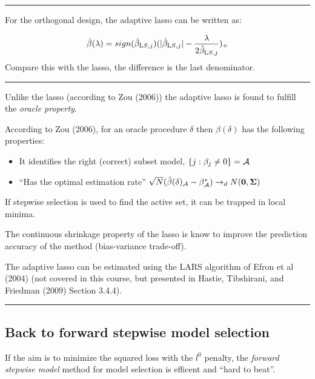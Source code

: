 \documentclass[
  letterpaper,
  DIV=11,
  numbers=noendperiod]{scrartcl}
\providecommand{\tightlist}{%
  \setlength{\itemsep}{0pt}\setlength{\parskip}{0pt}}\usepackage{longtable,booktabs,array}
\begin{document}
\begin{center}\rule{0.5\linewidth}{0.5pt}\end{center}

For the orthogonal design, the adaptive lasso can be written as:

\[\hat{\beta}(\lambda)=sign(\hat{\beta}_{{\text LS},j})(\lvert \hat{\beta}_{{\text LS},j}\rvert -\frac{\lambda}{2 \hat{\beta}_{{\text LS},j}} )_{+}\]
Compare this with the lasso, the difference is the last denominator.

\begin{center}\rule{0.5\linewidth}{0.5pt}\end{center}

Unlike the lasso (according to Zou (2006)) the adaptive lasso is found
to fulfill the \emph{oracle property}.

According to Zou (2006), for an oracle procedure \(\delta\) then
\(\beta(\delta)\) has the following properties:

\begin{itemize}
\tightlist
\item
  It identifies the right (correct) subset model,
  \(\{j: \beta_j \neq0\}={\cal A}\)
\item
  ``Has the optimal estimation rate''
  \(\sqrt{N}(\hat{\beta}(\delta)_{\cal A}-\beta^*_{\cal A})\rightarrow_d N(\boldsymbol 0,\boldsymbol \Sigma)\)
\end{itemize}

If stepwise selection is used to find the active set, it can be trapped
in local minima.

The continuous shrinkage property of the lasso is know to improve the
prediction accuracy of the method (bias-variance trade-off).

The adaptive lasso can be estimated using the LARS algorithm of Efron et
al (2004) (not covered in this course, but presented in Hastie,
Tibshirani, and Friedman (2009) Section 3.4.4).

\begin{center}\rule{0.5\linewidth}{0.5pt}\end{center}

\hypertarget{back-to-forward-stepwise-model-selection}{%
\subsection{Back to forward stepwise model
selection}\label{back-to-forward-stepwise-model-selection}}

If the aim is to minimize the squared loss with the \(l^0\) penalty, the
\emph{forward stepwise model} method for model selection is efficent and
``hard to beat''.
\end{document}
